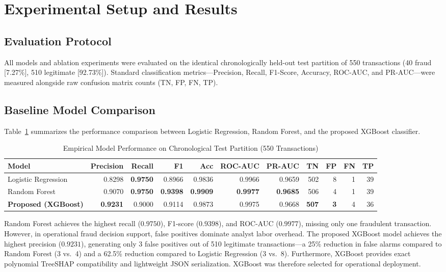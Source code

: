 \documentclass[conference]{IEEEtran}
\begin{document}
\section{Experimental Setup and Results}

\subsection{Evaluation Protocol}
All models and ablation experiments were evaluated on the identical chronologically held-out test partition of 550 transactions (40 fraud [7.27\%], 510 legitimate [92.73\%]). Standard classification metrics---Precision, Recall, F1-Score, Accuracy, ROC-AUC, and PR-AUC---were measured alongside raw confusion matrix counts (TN, FP, FN, TP).

\subsection{Baseline Model Comparison}
Table~\ref{tab:model_comparison} summarizes the performance comparison between Logistic Regression, Random Forest, and the proposed XGBoost classifier.

\begin{table}[t]
\centering
\caption{Empirical Model Performance on Chronological Test Partition (550 Transactions)}
\label{tab:model_comparison}
\small
\begin{tabular}{lrrrrrrrrrr}
\toprule
\textbf{Model} & \textbf{Precision} & \textbf{Recall} & \textbf{F1} & \textbf{Acc} & \textbf{ROC-AUC} & \textbf{PR-AUC} & \textbf{TN} & \textbf{FP} & \textbf{FN} & \textbf{TP} \\
\midrule
Logistic Regression & 0.8298 & \textbf{0.9750} & 0.8966 & 0.9836 & 0.9966 & 0.9659 & 502 & 8 & 1 & 39 \\
Random Forest & 0.9070 & \textbf{0.9750} & \textbf{0.9398} & \textbf{0.9909} & \textbf{0.9977} & \textbf{0.9685} & 506 & 4 & 1 & 39 \\
\textbf{Proposed (XGBoost)} & \textbf{0.9231} & 0.9000 & 0.9114 & 0.9873 & 0.9975 & 0.9668 & \textbf{507} & \textbf{3} & 4 & 36 \\
\bottomrule
\end{tabular}
\end{table}

Random Forest achieves the highest recall ($0.9750$), F1-score ($0.9398$), and ROC-AUC ($0.9977$), missing only one fraudulent transaction. However, in operational fraud decision support, false positives dominate analyst labor overhead. The proposed XGBoost model achieves the highest precision ($0.9231$), generating only 3 false positives out of 510 legitimate transactions---a 25\% reduction in false alarms compared to Random Forest (3 vs.\ 4) and a 62.5\% reduction compared to Logistic Regression (3 vs.\ 8). Furthermore, XGBoost provides exact polynomial TreeSHAP compatibility and lightweight JSON serialization. XGBoost was therefore selected for operational deployment.
\end{document}
